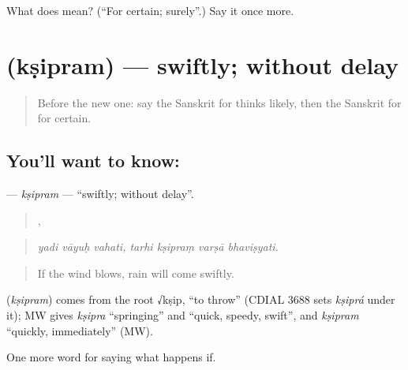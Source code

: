 \begin{tcolorbox}[breakable,colback=teal!4,colframe=teal!35!black,title={Before you move on}]
What does  mean? (\textquotedblleft{}For certain; surely\textquotedblright{}.) Say it once more.
\end{tcolorbox}
\section[\texorpdfstring{\sk{क्षिप्रम्} (kṣipram)}{क्षिप्रम् (kṣipram)}]{ (kṣipram) — swiftly; without delay}

\label{lesson:SA-C367-ksipram}



\begin{quote}
Before the new one: say the Sanskrit for thinks likely, then the Sanskrit for for certain.
\end{quote}

\subsection*{You'll want to know: }
\textbf{} — \emph{kṣipram} — \textquotedblleft{}swiftly; without delay\textquotedblright{}.

\begin{quote}
  ,    
\end{quote}

\begin{quote}
\emph{yadi vāyuḥ vahati, tarhi kṣipraṃ varṣā bhaviṣyati.}
\end{quote}

\begin{quote}
If the wind blows, rain will come swiftly.
\end{quote}

\begin{cousinweb}
\textbf{} (\emph{kṣipram}) comes from the root √kṣip, \textquotedblleft{}to throw\textquotedblright{} (CDIAL 3688 sets \emph{kṣiprá} under it); MW gives \emph{kṣipra} \textquotedblleft{}springing\textquotedblright{} and \textquotedblleft{}quick, speedy, swift\textquotedblright{}, and \emph{kṣipram} \textquotedblleft{}quickly, immediately\textquotedblright{} (MW).
\end{cousinweb}

\begin{grammarlens}[title={What you've built}]
One more word for saying what happens if.
\end{grammarlens}

